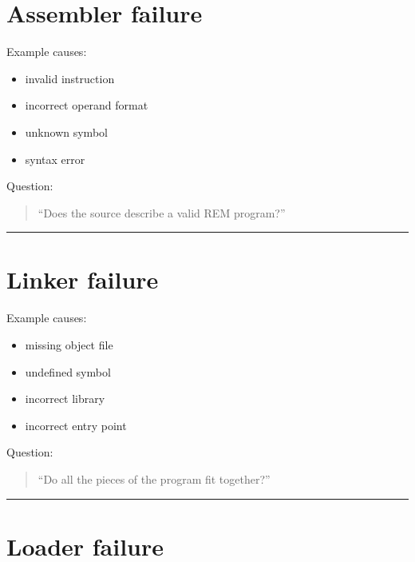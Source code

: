 \documentclass[
  oneside,
  openany]{book}
\providecommand{\tightlist}{%
  \setlength{\itemsep}{0pt}\setlength{\parskip}{0pt}}
\begin{document}
\hypertarget{assembler-failure}{%
\section{Assembler failure}\label{assembler-failure}}

Example causes:

\begin{itemize}
\tightlist
\item
  invalid instruction
\item
  incorrect operand format
\item
  unknown symbol
\item
  syntax error
\end{itemize}

Question:

\begin{quote}
``Does the source describe a valid REM program?''
\end{quote}

\begin{center}\rule{0.5\linewidth}{0.5pt}\end{center}

\hypertarget{linker-failure}{%
\section{Linker failure}\label{linker-failure}}

Example causes:

\begin{itemize}
\tightlist
\item
  missing object file
\item
  undefined symbol
\item
  incorrect library
\item
  incorrect entry point
\end{itemize}

Question:

\begin{quote}
``Do all the pieces of the program fit together?''
\end{quote}

\begin{center}\rule{0.5\linewidth}{0.5pt}\end{center}

\hypertarget{loader-failure}{%
\section{Loader failure}\label{loader-failure}}
\end{document}
